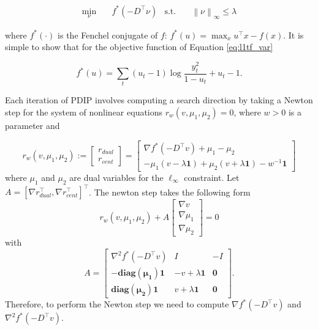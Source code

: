 \documentclass[letterpaper]{article} %
\newcommand{\one}{\mathbf{1}}
\newcommand{\norm}[1]{\left\lVert #1 \right\rVert}
\begin{document}
\begin{align}
\min_\nu&\quad f^*(-D^\top\nu) & \mbox{s.t.}&\quad \norm{ \nu }_\infty \le \lambda
\end{align}

\noindent where $f^*(\cdot)$ is the Fenchel conjugate of $f$: $f^*(u)=\max_x u^\top x-f(x)$. It is simple to show that for the objective function of Equation \ref{eq:l1tf_var}

\begin{equation}
f^*(u)=\sum_t (u_t-1)\log\frac{y_t^2}{1-u_t} + u_t-1.
\label{eq:conj}
\end{equation}

Each iteration of PDIP involves computing a search direction by taking a Newton step for the system of nonlinear equations $r_w(v,\mu_1,\mu_2)=0$, where $w>0$ is a parameter and

\begin{equation}
  r_w(v,\mu_1,\mu_2):=
	\begin{bmatrix}
	r_{dual}\\
	r_{cent}	
	\end{bmatrix}=
  \begin{bmatrix}
    \nabla f^*(-D^\top v) + \mu_1 - \mu_2\\
    -\mu_1(v-\lambda\one)+\mu_2(v + \lambda\one) -w^{-1}\one
  \end{bmatrix}
\label{eq:resid}
\end{equation}
where $\mu_1$ and $\mu_2$ are dual variables for the $\ell_\infty$ constraint. Let $A=[\nabla r_{dual}^\top , \nabla r_{cent}^\top]^\top$. The newton step takes the following form
\begin{equation}
r_w(v,\mu_1,\mu_2)+A
\begin{bmatrix}
	\nabla v\\
	\nabla \mu_1\\
	\nabla \mu_2	
	\end{bmatrix}= 0
\label{eq:newton_step}
\end{equation}
with
\begin{equation}
A=
\begin{bmatrix}
	\nabla^2 f^*(-D^\top v) & I & -I\\
	-\mathbf{diag(\mu_1)}\one & -v+\lambda\one & \mathbf{0}\\
	\mathbf{diag(\mu_2)}\one & v+\lambda\one & \mathbf{0}
	\end{bmatrix}.
\label{eq:delta_r}
\end{equation}
Therefore, to perform the Newton step we need to compute $\nabla
f^*(-D^\top v)$ and $\nabla^2 f^*(-D^\top v)$. 
\end{document}
